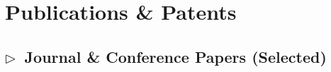 \documentclass[a4paper,12pt]{article}
\begin{document}
\section{\textbf{Publications \& Patents}}
\subsection*{\(\triangleright\)\  \textbf{Journal \& Conference Papers} (Selected)}

\begin{refsection}
\nocite{*}
\printbibliography[
    heading=none,
    sorting=none
]
\end{refsection}






\end{document}

